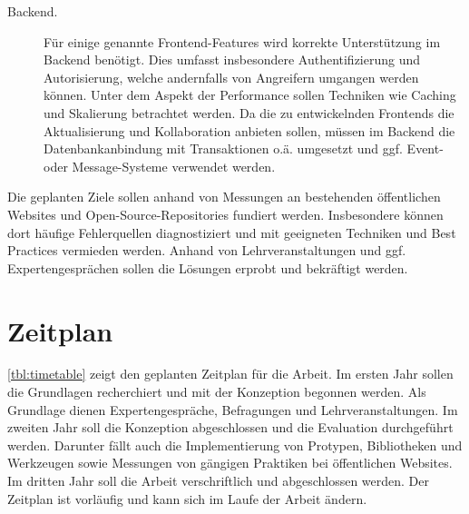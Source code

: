 \begin{description}
    \item[Backend.] Für einige genannte Frontend-Features wird korrekte Unterstützung im Backend benötigt.
    Dies umfasst insbesondere Authentifizierung und Autorisierung, welche andernfalls von Angreifern umgangen werden können.
    Unter dem Aspekt der Performance sollen Techniken wie Caching und Skalierung betrachtet werden.
    Da die zu entwickelnden Frontends die Aktualisierung und Kollaboration anbieten sollen, müssen im Backend die Datenbankanbindung mit Transaktionen o.ä. umgesetzt und ggf. Event- oder Message-Systeme verwendet werden.
\end{description}

Die geplanten Ziele sollen anhand von Messungen an bestehenden öffentlichen Websites und Open-Source-Repositories fundiert werden.
Insbesondere können dort häufige Fehlerquellen diagnostiziert und mit geeigneten Techniken und Best Practices vermieden werden.
Anhand von Lehrveranstaltungen und ggf. Expertengesprächen sollen die Lösungen erprobt und bekräftigt werden.

\section{Zeitplan}\label{sec:zeitplan}

\autoref{tbl:timetable} zeigt den geplanten Zeitplan für die Arbeit.
Im ersten Jahr sollen die Grundlagen recherchiert und mit der Konzeption begonnen werden.
Als Grundlage dienen Expertengespräche, Befragungen und Lehrveranstaltungen.
Im zweiten Jahr soll die Konzeption abgeschlossen und die Evaluation durchgeführt werden.
Darunter fällt auch die Implementierung von Protypen, Bibliotheken und Werkzeugen sowie Messungen von gängigen Praktiken bei öffentlichen Websites.
Im dritten Jahr soll die Arbeit verschriftlich und abgeschlossen werden.
Der Zeitplan ist vorläufig und kann sich im Laufe der Arbeit ändern.

